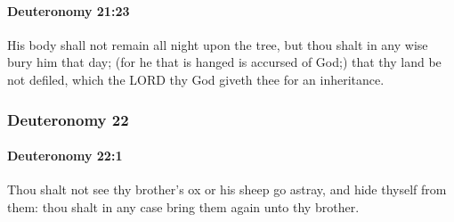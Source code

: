 		\paragraph{Deuteronomy 21:23} %
			\label{DEUTERONOMY-21-23}

			His body shall not remain all night upon the tree, but thou shalt in any wise bury him that day; (for he that is hanged is accursed of God;) that thy land be not defiled, which the LORD thy God giveth thee for an inheritance.

	\subsubsection{Deuteronomy 22} %
		\label{DEUTERONOMY-22}

		\paragraph{Deuteronomy 22:1} %
			\label{DEUTERONOMY-22-1}

			Thou shalt not see thy brother's ox or his sheep go astray, and hide thyself from them: thou shalt in any case bring them again unto thy brother.

